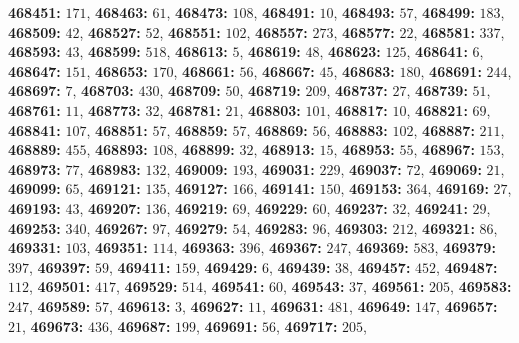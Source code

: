 \textsf{\bfseries 468451:} $171$, \textsf{\bfseries 468463:} $61$, \textsf{\bfseries 468473:} $108$, \textsf{\bfseries 468491:} $10$, \textsf{\bfseries 468493:} $57$, \textsf{\bfseries 468499:} $183$, \textsf{\bfseries 468509:} $42$, \textsf{\bfseries 468527:} $52$, \textsf{\bfseries 468551:} $102$, \textsf{\bfseries 468557:} $273$, \textsf{\bfseries 468577:} $22$, \textsf{\bfseries 468581:} $337$, \textsf{\bfseries 468593:} $43$, \textsf{\bfseries 468599:} $518$, \textsf{\bfseries 468613:} $5$, \textsf{\bfseries 468619:} $48$, \textsf{\bfseries 468623:} $125$, \textsf{\bfseries 468641:} $6$, \textsf{\bfseries 468647:} $151$, \textsf{\bfseries 468653:} $170$, \textsf{\bfseries 468661:} $56$, \textsf{\bfseries 468667:} $45$, \textsf{\bfseries 468683:} $180$, \textsf{\bfseries 468691:} $244$, \textsf{\bfseries 468697:} $7$, \textsf{\bfseries 468703:} $430$, \textsf{\bfseries 468709:} $50$, \textsf{\bfseries 468719:} $209$, \textsf{\bfseries 468737:} $27$, \textsf{\bfseries 468739:} $51$, \textsf{\bfseries 468761:} $11$, \textsf{\bfseries 468773:} $32$, \textsf{\bfseries 468781:} $21$, \textsf{\bfseries 468803:} $101$, \textsf{\bfseries 468817:} $10$, \textsf{\bfseries 468821:} $69$, \textsf{\bfseries 468841:} $107$, \textsf{\bfseries 468851:} $57$, \textsf{\bfseries 468859:} $57$, \textsf{\bfseries 468869:} $56$, \textsf{\bfseries 468883:} $102$, \textsf{\bfseries 468887:} $211$, \textsf{\bfseries 468889:} $455$, \textsf{\bfseries 468893:} $108$, \textsf{\bfseries 468899:} $32$, \textsf{\bfseries 468913:} $15$, \textsf{\bfseries 468953:} $55$, \textsf{\bfseries 468967:} $153$, \textsf{\bfseries 468973:} $77$, \textsf{\bfseries 468983:} $132$, \textsf{\bfseries 469009:} $193$, \textsf{\bfseries 469031:} $229$, \textsf{\bfseries 469037:} $72$, \textsf{\bfseries 469069:} $21$, \textsf{\bfseries 469099:} $65$, \textsf{\bfseries 469121:} $135$, \textsf{\bfseries 469127:} $166$, \textsf{\bfseries 469141:} $150$, \textsf{\bfseries 469153:} $364$, \textsf{\bfseries 469169:} $27$, \textsf{\bfseries 469193:} $43$, \textsf{\bfseries 469207:} $136$, \textsf{\bfseries 469219:} $69$, \textsf{\bfseries 469229:} $60$, \textsf{\bfseries 469237:} $32$, \textsf{\bfseries 469241:} $29$, \textsf{\bfseries 469253:} $340$, \textsf{\bfseries 469267:} $97$, \textsf{\bfseries 469279:} $54$, \textsf{\bfseries 469283:} $96$, \textsf{\bfseries 469303:} $212$, \textsf{\bfseries 469321:} $86$, \textsf{\bfseries 469331:} $103$, \textsf{\bfseries 469351:} $114$, \textsf{\bfseries 469363:} $396$, \textsf{\bfseries 469367:} $247$, \textsf{\bfseries 469369:} $583$, \textsf{\bfseries 469379:} $397$, \textsf{\bfseries 469397:} $59$, \textsf{\bfseries 469411:} $159$, \textsf{\bfseries 469429:} $6$, \textsf{\bfseries 469439:} $38$, \textsf{\bfseries 469457:} $452$, \textsf{\bfseries 469487:} $112$, \textsf{\bfseries 469501:} $417$, \textsf{\bfseries 469529:} $514$, \textsf{\bfseries 469541:} $60$, \textsf{\bfseries 469543:} $37$, \textsf{\bfseries 469561:} $205$, \textsf{\bfseries 469583:} $247$, \textsf{\bfseries 469589:} $57$, \textsf{\bfseries 469613:} $3$, \textsf{\bfseries 469627:} $11$, \textsf{\bfseries 469631:} $481$, \textsf{\bfseries 469649:} $147$, \textsf{\bfseries 469657:} $21$, \textsf{\bfseries 469673:} $436$, \textsf{\bfseries 469687:} $199$, \textsf{\bfseries 469691:} $56$, \textsf{\bfseries 469717:} $205$, 
